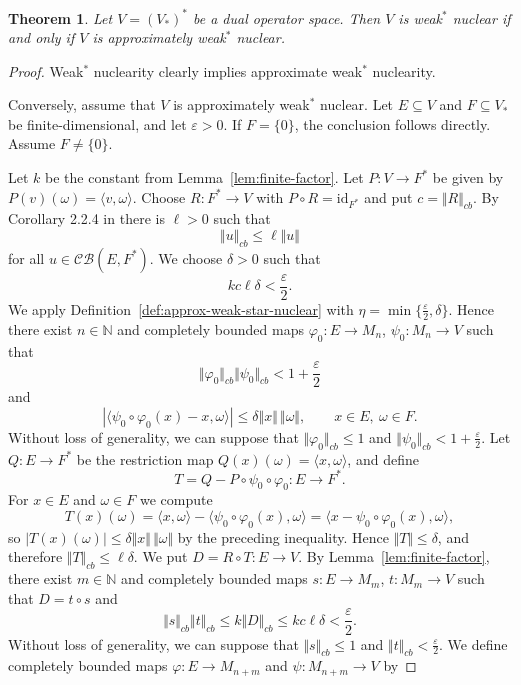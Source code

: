 \documentclass[12pt]{article}
\newtheorem{theorem}{Theorem}[section]
\theoremstyle{definition}
\theoremstyle{remark}
\begin{document}
\begin{theorem}\label{thm:approx-weak-star-nuclear}
Let $V=(V_*)^*$ be a dual operator space. Then $V$ is weak$^{*}$
nuclear if and only if $V$ is approximately weak$^{*}$ nuclear.
\end{theorem}

\begin{proof}
Weak$^{*}$ nuclearity clearly implies approximate weak$^{*}$
nuclearity.

Conversely, assume that $V$ is approximately weak$^{*}$ nuclear. Let
$E\subseteq V$ and $F\subseteq V_*$ be finite-dimensional, and let
$\varepsilon>0$. If $F=\{0\}$, the conclusion follows directly. Assume
$F\ne\{0\}$.

Let $k$ be the constant from Lemma~\ref{lem:finite-factor}. Let
$P:V\to F^*$ be given by $P(v)(\omega)=\langle v,\omega\rangle$.
Choose $R:F^*\to V$ with $P\circ R=\mathrm{id}_{F^*}$ and put
$c=\Vert R\Vert_{cb}$. By Corollary 2.2.4 in 
\cite{ER00} there is $\ell>0$ such that
\[
\Vert u\Vert_{cb}\le \ell\Vert u\Vert
\]
for all $u\in\mathcal{CB}(E,F^*)$.
We choose $\delta>0$ such that
\[
kc\ell\delta<\frac{\varepsilon}{2}.
\]
We apply Definition~\ref{def:approx-weak-star-nuclear} with
$\eta=\min\{\frac{\varepsilon}{2},\delta\}$. Hence there exist $n\in\mathbb N$ and
completely bounded maps $\varphi_0:E\to M_n$, $\psi_0:M_n\to V$ such
that
\[
\Vert\varphi_0\Vert_{cb}\Vert\psi_0\Vert_{cb}<1+\frac{\varepsilon}{2}
\]
and
\[
|\langle\psi_0\circ\varphi_0(x)-x,\omega\rangle|
\le\delta\Vert x\Vert\,\Vert\omega\Vert,
\qquad x\in E,\ \omega\in F.
\]
Without loss of generality, we can suppose that $\Vert \varphi_{0}\Vert_{cb}\leq 1$ and $\Vert \psi_{0}\Vert_{cb}<1+\frac{\varepsilon}{2}$.
Let $Q:E\to F^*$ be the restriction map
$Q(x)(\omega)=\langle x,\omega\rangle$, and define
\[
T=Q-P\circ\psi_0\circ\varphi_0:E\to F^*.
\]
For $x\in E$ and $\omega\in F$ we compute
\[
T(x)(\omega)=\langle x,\omega\rangle-\langle\psi_0\circ\varphi_0(x),\omega\rangle
=\langle x-\psi_0\circ\varphi_0(x),\omega\rangle,
\]
so $|T(x)(\omega)|\le \delta\Vert x\Vert\,\Vert\omega\Vert$ by the preceding inequality. Hence $\Vert T\Vert\le \delta$, and therefore $\Vert T\Vert_{cb}\le \ell\delta$.
We put $D=R\circ T:E\to V$. By Lemma~\ref{lem:finite-factor}, there exist $m\in\mathbb N$ and completely bounded maps $s:E\to M_m$, $t:M_m\to V$ such that $D=t\circ s$ and
\[
\Vert s\Vert_{cb}\Vert t\Vert_{cb}
\le k\Vert D\Vert_{cb}
\le kc\ell\delta<\frac{\varepsilon}{2}.
\]
Without loss of generality, we can suppose that $\Vert s\Vert_{cb}\leq 1$ and $\Vert t\Vert_{cb}<\frac{\varepsilon}{2}$. We define completely bounded maps $\varphi:E\to M_{n+m}$ and $\psi:M_{n+m}\to V$ by

\end{proof}
\end{document}
